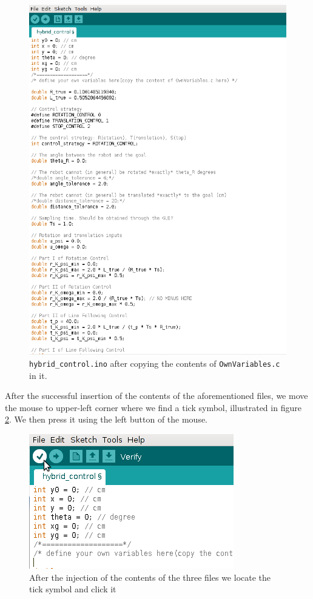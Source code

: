 \begin{figure}[H]
  \includegraphics[scale=0.6]{./figures/task_20/2.png}
  \caption{\texttt{hybrid\_control.ino} after copying the contents of
    \texttt{OwnVariables.c} in it.}
  \label{fig:20_2}
\end{figure}

After the successful insertion of the contents of
the aforementioned files, we move the mouse to upper-left corner where we find
a tick symbol, illustrated in figure \ref{fig:20_3}. We then press it using the
left button of the mouse.

\begin{figure}[H]
  \includegraphics[scale=1]{./figures/task_20/3.png}
  \caption{After the injection of the contents of the three files we locate
    the tick symbol and click it}
  \label{fig:20_3}
\end{figure}
